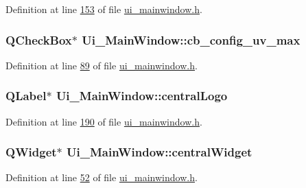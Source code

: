 Definition at line \hyperlink{a00139_source_l00153}{153} of file \hyperlink{a00139_source}{ui\+\_\+mainwindow.\+h}.

\hypertarget{a00080_a13ce5fddc83683d7b8b717f0b9a4e2cf}{
\subsubsection[{cb\+\_\+config\+\_\+uv\+\_\+max}]{\setlength{\rightskip}{0pt plus 5cm}Q\+Check\+Box$\ast$ Ui\+\_\+\+Main\+Window\+::cb\+\_\+config\+\_\+uv\+\_\+max}}\label{a00080_a13ce5fddc83683d7b8b717f0b9a4e2cf}


Definition at line \hyperlink{a00139_source_l00089}{89} of file \hyperlink{a00139_source}{ui\+\_\+mainwindow.\+h}.

\hypertarget{a00080_ab5c037236f041a2a7753d3e4efd3d0e8}{
\subsubsection[{central\+Logo}]{\setlength{\rightskip}{0pt plus 5cm}Q\+Label$\ast$ Ui\+\_\+\+Main\+Window\+::central\+Logo}}\label{a00080_ab5c037236f041a2a7753d3e4efd3d0e8}


Definition at line \hyperlink{a00139_source_l00190}{190} of file \hyperlink{a00139_source}{ui\+\_\+mainwindow.\+h}.

\hypertarget{a00080_a30075506c2116c3ed4ff25e07ae75f81}{
\subsubsection[{central\+Widget}]{\setlength{\rightskip}{0pt plus 5cm}Q\+Widget$\ast$ Ui\+\_\+\+Main\+Window\+::central\+Widget}}\label{a00080_a30075506c2116c3ed4ff25e07ae75f81}


Definition at line \hyperlink{a00139_source_l00052}{52} of file \hyperlink{a00139_source}{ui\+\_\+mainwindow.\+h}.



